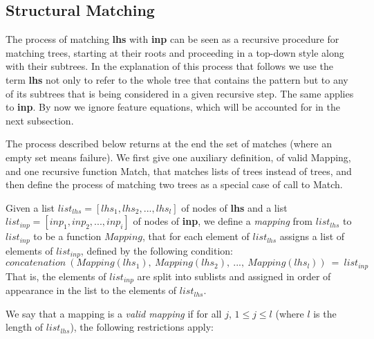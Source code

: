 \subsection{Structural Matching} 
 
The process of matching {\bf lhs} with {\bf inp} can be seen as a recursive 
procedure for matching trees, starting at their roots and proceeding in a 
top-down style along with their subtrees. 
In the explanation of this process that 
follows we use the term {\bf lhs} not only to refer to the whole tree 
that contains the pattern 
but to any of its subtrees that is being considered in a 
given recursive step. The same applies to {\bf inp}. 
By now we ignore feature equations, 
which will be accounted for in the next subsection. 
 
The process described below returns at the end the set of matches (where an 
empty set means failure). We first give one auxiliary definition, of valid 
Mapping, and one recursive function Match, that matches lists of trees instead 
of trees, and then define the process of matching two trees as a special case 
of call to Match. 
 
Given a list $list_{lhs}=[lhs_1, lhs_2, ..., lhs_l]$ of nodes of {\bf lhs} 
and a list $list_{inp}=[inp_1, inp_2, ..., inp_i]$ of nodes of {\bf inp}, 
we define a {\it mapping} from $list_{lhs}$ to $list_{inp}$ to be a function 
$Mapping$, 
that for each element of $list_{lhs}$ assigns a list of elements of 
$list_{inp}$, defined by the following condition: 
$$concatenation\ (Mapping(lhs_1),\ Mapping(lhs_2),\ ...,\ Mapping(lhs_l))\ =\ 
        list_{inp}$$ 
That is, the elements of $list_{inp}$ are split into sublists and assigned in 
order of appearance in the list to the elements of $list_{lhs}$. 
 
We say that a mapping is a {\it valid mapping} if for all $j$, $1\leq j \leq l$ 
(where $l$ is the length of $list_{lhs}$), the following restrictions apply: 
 
